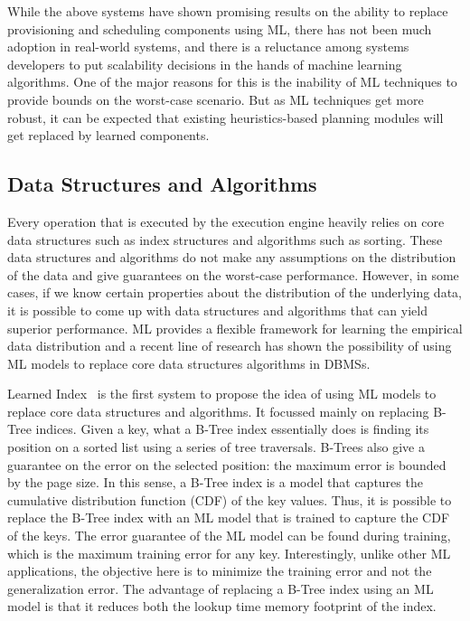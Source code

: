 While the above systems have shown promising results on the ability to replace provisioning and scheduling components using ML, there has not been much adoption in real-world systems, and there is a reluctance among systems developers to put scalability decisions in the hands of machine learning algorithms.
One of the major reasons for this is the inability of ML techniques to provide bounds on the worst-case scenario.
But as ML techniques get more robust, it can be expected that existing heuristics-based planning modules will get replaced by learned components.

\subsection{Data Structures and Algorithms}
Every operation that is executed by the execution engine heavily relies on core data structures such as index structures and algorithms such as sorting.
These data structures and algorithms do not make any assumptions on the distribution of the data and give guarantees on the worst-case performance.
However, in some cases, if we know certain properties about the distribution of the underlying data, it is possible to come up with data structures and algorithms that can yield superior performance.
ML provides a flexible framework for learning the empirical data distribution and a recent line of research has shown the possibility of using ML models to replace core data structures algorithms in DBMSs.

Learned Index~\cite{learnedindex} is the first system to propose the idea of using ML models to replace core data structures and algorithms. It focussed mainly on replacing B-Tree indices. 
Given a key, what a B-Tree index essentially does is finding its position on a sorted list using a series of tree traversals.
B-Trees also give a guarantee on the error on the selected position: the maximum error is bounded by the page size.
In this sense, a B-Tree index is a model that captures the cumulative distribution function (CDF) of the key values.
Thus, it is possible to replace the B-Tree index with an ML model that is trained to capture the CDF of the keys.
The error guarantee of the ML model can be found during training, which is the maximum training error for any key.
Interestingly, unlike other ML applications, the objective here is to minimize the training error and not the generalization error.
The advantage of replacing a B-Tree index using an ML model is that it reduces both the lookup time memory footprint of the index.

